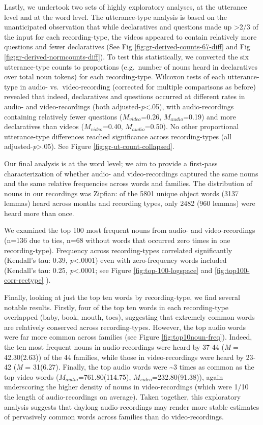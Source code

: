 \documentclass[man]{apa6}
\theoremstyle{definition}
\theoremstyle{definition}
\theoremstyle{definition}
\theoremstyle{remark}
\begin{document}
Lastly, we undertook two sets of highly exploratory analyses, at the
utterance level and at the word level. The utterance-type analysis is
based on the unanticipated observation that while declaratives and
questions made up \textgreater{}2/3 of the input for each
recording-type, the videos appeared to contain relatively more questions
and fewer declaratives (See Fig \ref{fig:gr-derived-counts-67-diff} and
Fig \ref{fig:gr-derived-normcounts-diff}). To test this statistically,
we converted the six utterance-type counts to proportions (e.g.~number
of nouns heard in declaratives over total noun tokens) for each
recording-type. Wilcoxon tests of each utterance-type in audio-
vs.~video-recording (corrected for multiple comparisons as before)
revealed that indeed, declaratives and questions occurred at different
rates in audio- and video-recordings (both
adjusted-\emph{p}\textless{}.05), with audio-recordings containing
relatively fewer questions (\(M_{video}\)=0.26, \(M_{audio}\)=0.19) and
more declaratives than videos (\(M_{video}\)=0.40, \(M_{audio}\)=0.50).
No other proportional utterance-type differences reached significance
across recording-types (all adjusted-\emph{p}\textgreater{}.05). See
Figure \ref{fig:gr-ut-count-collapsed}.

Our final analysis is at the word level; we aim to provide a first-pass
characterization of whether audio- and video-recordings captured the
same nouns and the same relative frequencies across words and families.
The distribution of nouns in our recordings was Zipfian: of the 5801
unique object words (3137 lemmas) heard across months and recording
types, only 2482 (960 lemmas) were heard more than once.

We examined the top 100 most frequent nouns from audio- and
video-recordings (n=136 due to ties, n=68 without words that occurred
zero times in one recording-type). Frequency across recording-types
correlated significantly (Kendall's tau: 0.39, \emph{p}\textless{}.0001)
even with zero-frequency words included (Kendall's tau: 0.25,
\emph{p}\textless{}.0001; see Figure \ref{fig:top-100-logspace} and
\ref{fig:top100-corr-rectype} ).

Finally, looking at just the top ten words by recording-type, we find
several notable results. Firstly, four of the top ten words in each
recording-type overlapped (baby, book, mouth, toes), suggesting that
extremely common words are relatively conserved across recording-types.
However, the top audio words were far more common across families (see
Figure \ref{fig:top10noun-freq}). Indeed, the ten most frequent nouns in
audio-recordings were heard by 37-44 (\emph{M} = 42.30(2.63)) of the 44
families, while those in video-recordings were heard by 23-42 (\emph{M}
= 31(6.27). Finally, the top audio words were \textasciitilde{}3 times
as common as the top video words (\(M_{audio}\)=761.80(114.75),
\(M_{video}\)=232.80(91.38)), again underscoring the higher density of
nouns in video-recordings (which were 1/10 the length of
audio-recordings on average). Taken together, this exploratory analysis
suggests that daylong audio-recordings may render more stable estimates
of pervasively common words across families than do video-recordings.
\end{document}

